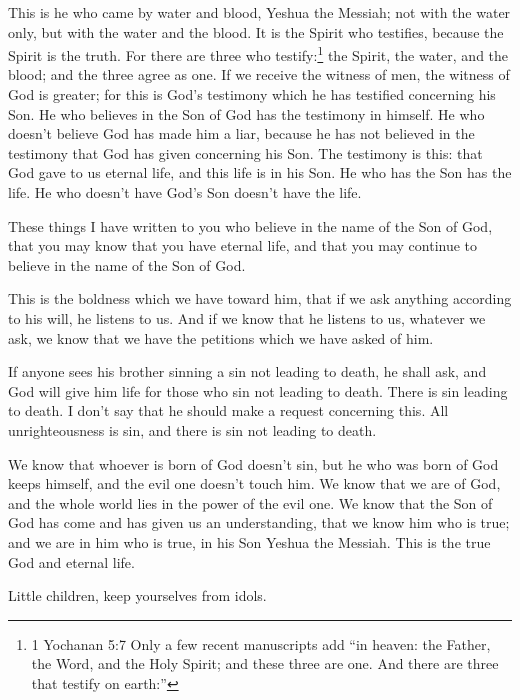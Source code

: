 \myverse{}This is he who came by water and blood, Yeshua the Messiah; not with the water only, but with the water and the blood. It is the Spirit who testifies, because the Spirit is the truth. \myverse{}For there are three who testify:\footnote{ 1 Yochanan 5:7 Only a few recent manuscripts add “in heaven: the Father, the Word, and the Holy Spirit; and these three are one. And there are three that testify on earth:”} \myverse{}the Spirit, the water, and the blood; and the three agree as one. \myverse{}If we receive the witness of men, the witness of God is greater; for this is God’s testimony which he has testified concerning his Son. \myverse{}He who believes in the Son of God has the testimony in himself. He who doesn’t believe God has made him a liar, because he has not believed in the testimony that God has given concerning his Son. \myverse{}The testimony is this: that God gave to us eternal life, and this life is in his Son. \myverse{}He who has the Son has the life. He who doesn’t have God’s Son doesn’t have the life.


\myverse{}These things I have written to you who believe in the name of the Son of God, that you may know that you have eternal life, and that you may continue to believe in the name of the Son of God.


\myverse{}This is the boldness which we have toward him, that if we ask anything according to his will, he listens to us. \myverse{}And if we know that he listens to us, whatever we ask, we know that we have the petitions which we have asked of him.


\myverse{}If anyone sees his brother sinning a sin not leading to death, he shall ask, and God will give him life for those who sin not leading to death. There is sin leading to death. I don’t say that he should make a request concerning this. \myverse{}All unrighteousness is sin, and there is sin not leading to death.


\myverse{}We know that whoever is born of God doesn’t sin, but he who was born of God keeps himself, and the evil one doesn’t touch him. \myverse{}We know that we are of God, and the whole world lies in the power of the evil one. \myverse{}We know that the Son of God has come and has given us an understanding, that we know him who is true; and we are in him who is true, in his Son Yeshua the Messiah. This is the true God and eternal life.


\myverse{}Little children, keep yourselves from idols.


